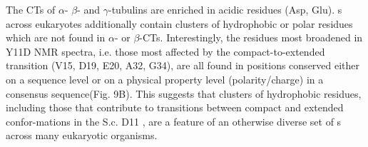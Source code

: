 The CTs of $\alpha$- $\beta$- and $\gamma$-tubulins are enriched in acidic residues (Asp, Glu). \gct{} s across eukaryotes additionally contain clusters of hydrophobic or polar residues which are not found in $\alpha$- or $\beta$-CTs. Interestingly, the residues most broadened in Y11D NMR spectra, i.e. those most affected by the compact-to-extended transition (V15, D19, E20, A32, G34), are all found in positions conserved either on a sequence level or on a physical property level (polarity/charge) in a consensus \gct{} sequence(Fig. 9B). This suggests that clusters of hydrophobic residues, including those that contribute to transitions between compact and extended confor-mations in the S.c. D11 \gct{}, are a feature of an otherwise diverse set of \gct{} s across many eukaryotic organisms.  

